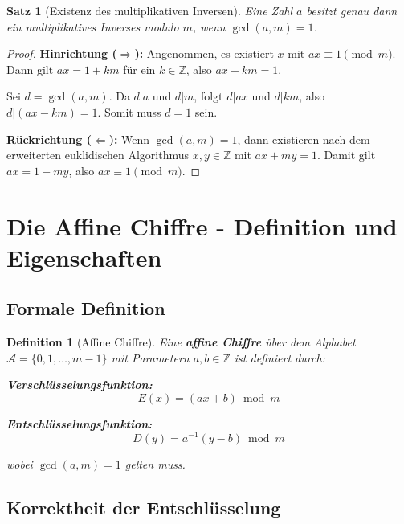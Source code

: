 ﻿\documentclass[12pt,a4paper]{article}
\newtheorem{theorem}{Satz}
\newtheorem{definition}{Definition}
\begin{document}
	\begin{theorem}[Existenz des multiplikativen Inversen]
		Eine Zahl $a$ besitzt genau dann ein multiplikatives Inverses modulo $m$, wenn $\gcd(a,m) = 1$.
	\end{theorem}
	
	\begin{proof}
		\textbf{Hinrichtung ($\Rightarrow$):} 
		Angenommen, es existiert $x$ mit $ax \equiv 1 \pmod{m}$. Dann gilt $ax = 1 + km$ für ein $k \in \mathbb{Z}$, also $ax - km = 1$.
		
		Sei $d = \gcd(a,m)$. Da $d|a$ und $d|m$, folgt $d|ax$ und $d|km$, also $d|(ax-km) = 1$. Somit muss $d = 1$ sein.
		
		\textbf{Rückrichtung ($\Leftarrow$):}
		Wenn $\gcd(a,m) = 1$, dann existieren nach dem erweiterten euklidischen Algorithmus $x,y \in \mathbb{Z}$ mit $ax + my = 1$. Damit gilt $ax = 1 - my$, also $ax \equiv 1 \pmod{m}$.
	\end{proof}
	
	\section{Die Affine Chiffre - Definition und Eigenschaften}
	
	\subsection{Formale Definition}
	
	\begin{definition}[Affine Chiffre]
		Eine \textbf{affine Chiffre} über dem Alphabet $\mathcal{A} = \{0, 1, \ldots, m-1\}$ mit Parametern $a, b \in \mathbb{Z}$ ist definiert durch:
		
		\textbf{Verschlüsselungsfunktion:}
		\begin{equation}
			E(x) = (ax + b) \bmod m
		\end{equation}
		
		\textbf{Entschlüsselungsfunktion:}
		\begin{equation}
			D(y) = a^{-1}(y - b) \bmod m
		\end{equation}
		
		wobei $\gcd(a,m) = 1$ gelten muss.
	\end{definition}
	
	\subsection{Korrektheit der Entschlüsselung}
	
\end{document}
